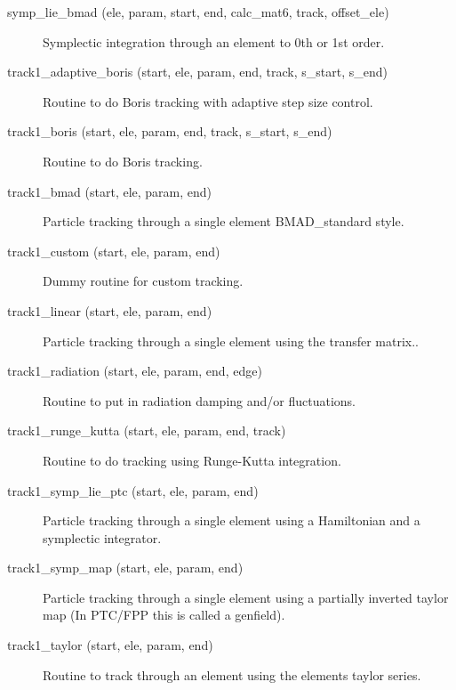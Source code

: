 \begin{description}

\label{r:symp.lie.bmad}
\item[symp_lie_bmad (ele, param, start, end, calc_mat6, track, offset_ele)] \Newline
Symplectic integration through an element to 0th or 1st order.

\label{r:track1.adaptive.boris}
\item[track1_adaptive_boris (start, ele, param, end, track, s_start, s_end)] \Newline
Routine to do Boris tracking with adaptive step size control. 

\label{r:track1.boris}
\item[track1_boris (start, ele, param, end, track, s_start, s_end)] \Newline
Routine to do Boris tracking.  

\label{r:track1.bmad}
\item[track1_bmad (start, ele, param, end)] \Newline
Particle tracking through a single element BMAD_standard style. 

\label{r:track1.custom}
\item[track1_custom (start, ele, param, end)] \Newline
Dummy routine for custom tracking.

\label{r:track1.linear}
\item[track1_linear (start, ele, param, end)] \Newline
Particle tracking through a single element using the transfer matrix.. 

\label{r:track1.radiation}
\item[track1_radiation (start, ele, param, end, edge)] \Newline
Routine to put in radiation damping and/or fluctuations. 

\label{r:track1.runge.kutta}
\item[track1_runge_kutta (start, ele, param, end, track)] \Newline
Routine to do tracking using Runge-Kutta integration. 

\label{r:track1.symp.lie.ptc}
\item[track1_symp_lie_ptc (start, ele, param, end)] \Newline
Particle tracking through a single element using a Hamiltonian and a 
symplectic integrator. 

\label{r:track1.symp.map}
\item[track1_symp_map (start, ele, param, end)] \Newline
Particle tracking through a single element using a partially inverted 
taylor map (In PTC/FPP this is called a genfield). 

\label{r:track1.taylor}
\item[track1_taylor (start, ele, param, end)] \Newline
Routine to track through an element using the elements taylor series. 

\end{description}

